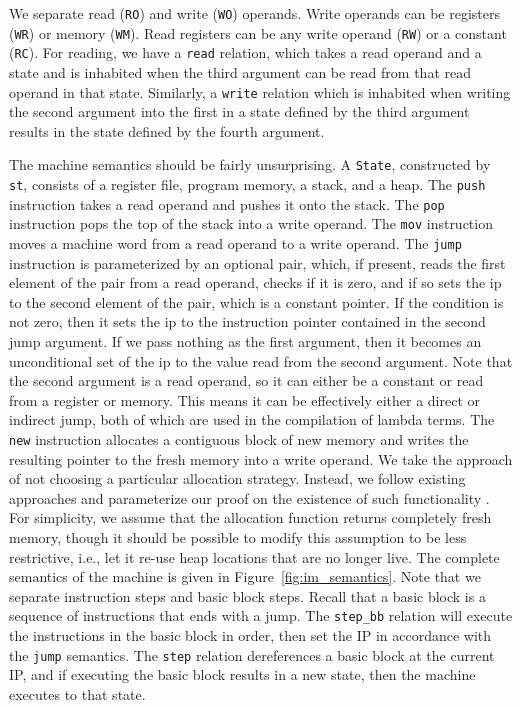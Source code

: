 We separate read (\texttt{RO}) and write (\texttt{WO}) operands. Write
operands can be registers (\texttt{WR}) or memory (\texttt{WM}). Read registers
can be any write operand (\texttt{RW}) or a constant (\texttt{RC}). For reading,
we have a \texttt{read} relation, which takes a read operand and a state and is
inhabited when the third argument can be read from that read operand in that
state. Similarly, a \texttt{write} relation which is inhabited when writing the
second argument into the first in a state defined by the third argument results
in the state defined by the fourth argument.  

The machine semantics should be fairly unsurprising. A \texttt{State},
constructed by \texttt{st}, consists of a register file, program memory, a
stack, and a heap. The \texttt{push} instruction takes a read operand and pushes
it onto the stack. The \texttt{pop} instruction pops the top of the stack into a
write operand. The \texttt{mov} instruction moves a machine word from a read
operand to a write operand. The \texttt{jump} instruction is parameterized by an
optional pair, which, if present, reads the first element of the pair from a read
operand, checks if it is zero, and if so sets the ip to the second element of
the pair, which is a constant pointer. If the condition is not zero, then it
sets the ip to the instruction pointer contained in the second jump argument. If
we pass nothing as the first argument, then it becomes an unconditional set of
the ip to the value read from the second argument.  Note that the second
argument is a read operand, so it can either be a constant or read from a register
or memory. This means it can be effectively either a direct or indirect jump,
both of which are used in the compilation of lambda terms. The \texttt{new}
instruction allocates a contiguous block of new memory and writes the resulting
pointer to the fresh memory into a write operand. We take the approach of not
choosing a particular allocation strategy. Instead, we follow existing
approaches and parameterize our proof on the existence of such functionality
\cite{chlipala2007certified}. For simplicity, we assume that the allocation
function returns completely fresh memory, though it should be possible to modify
this assumption to be less restrictive, i.e., let it re-use heap locations that
are no longer live. The complete semantics of the machine is given in
Figure~\ref{fig:im_semantics}.  Note that we separate instruction steps and
basic block steps. Recall that a basic block is a sequence of instructions that
ends with a jump. The \texttt{step\_bb} relation will execute the instructions
in the basic block in order, then set the IP in accordance with the
\texttt{jump} semantics. The \texttt{step} relation dereferences a basic block
at the current IP, and if executing the basic block results in a new state, then
the machine executes to that state. 

